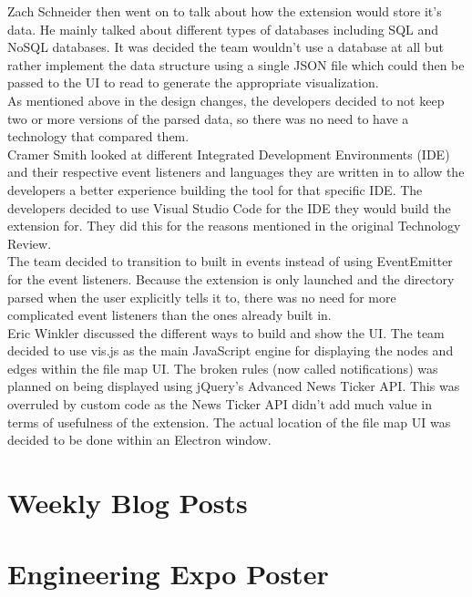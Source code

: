 \documentclass[letterpaper,10pt,titlepage,draftclsnofoot,onecolumn,onesided] {IEEEtran}
\begin{document}
Zach Schneider then went on to talk about how the extension would store it's data.
He mainly talked about different types of databases including SQL and NoSQL databases.
It was decided the team wouldn't use a database at all but rather implement the data structure using a single JSON file which could then be passed to the UI to read to generate the appropriate visualization. \\

As mentioned above in the design changes, the developers decided to not keep two or more versions of the parsed data, so there was no need to have a technology that compared them. \\

Cramer Smith looked at different Integrated Development Environments (IDE) and their respective event listeners and languages they are written in to allow the developers a better experience building the tool for that specific IDE.
The developers decided to use Visual Studio Code for the IDE they would build the extension for.
They did this for the reasons mentioned in the original Technology Review.\\

The team decided to transition to built in events instead of using EventEmitter for the event listeners.
Because the extension is only launched and the directory parsed when the user explicitly tells it to, there was no need for more complicated event listeners than the ones already built in. \\

Eric Winkler discussed the different ways to build and show the UI. 
The team decided to use vis.js as the main JavaScript engine for displaying the nodes and edges within the file map UI.
The broken rules (now called notifications) was planned on being displayed using jQuery's Advanced News Ticker API. 
This was overruled by custom code as the News Ticker API didn't add much value in terms of usefulness of the extension.
The actual location of the file map UI was decided to be done within an Electron window.\\

\section{Weekly Blog Posts}
		
		
	

\section{Engineering Expo Poster}
\end{document}
